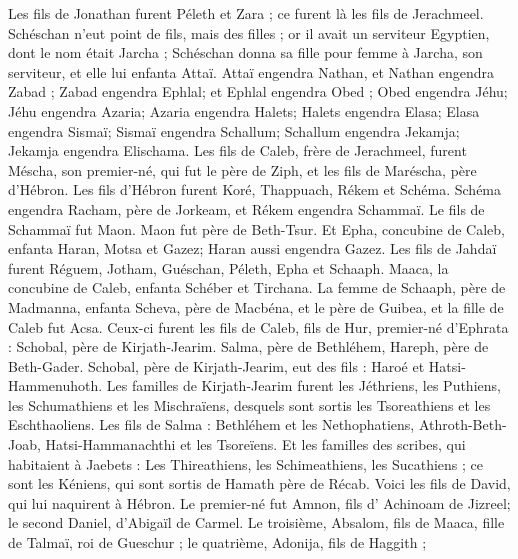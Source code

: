 \begin{multicols}{2}
Les fils de Jonathan furent Péleth et Zara ; ce furent là les fils de Jerachmeel.
Schéschan n'eut point de fils, mais des filles ; or il avait un serviteur Egyptien, dont le nom était Jarcha ;
Schéschan donna sa fille pour femme à Jarcha, son serviteur, et elle lui enfanta Attaï.
Attaï engendra Nathan, et Nathan engendra Zabad ;
Zabad engendra Ephlal; et Ephlal engendra Obed ;
 Obed engendra Jéhu; Jéhu engendra Azaria;
Azaria engendra Halets;  Halets engendra Elasa;
Elasa engendra Sismaï; Sismaï engendra Schallum;
Schallum engendra Jekamja; Jekamja engendra Elischama.
Les fils de Caleb, frère de Jerachmeel, furent Méscha, son premier-né, qui fut le père de Ziph, et les fils de Maréscha, père d'Hébron.
Les fils d'Hébron furent  Koré, Thappuach, Rékem et Schéma.
Schéma engendra Racham, père de Jorkeam, et Rékem engendra Schammaï.
Le fils de Schammaï fut Maon. Maon fut père de Beth-Tsur.
Et Epha, concubine de Caleb, enfanta Haran, Motsa et Gazez; Haran aussi engendra Gazez.
Les fils de Jahdaï furent Réguem, Jotham, Guéschan, Péleth, Epha et Schaaph.
Maaca, la concubine de Caleb, enfanta Schéber et Tirchana.
La femme de Schaaph, père de Madmanna, enfanta Scheva, père de Macbéna, et le père de Guibea, et la fille de Caleb fut Acsa.
Ceux-ci furent les fils de Caleb, fils de Hur, premier-né d'Ephrata : Schobal, père de Kirjath-Jearim.
Salma, père de Bethléhem, Hareph, père de Beth-Gader.
Schobal, père de Kirjath-Jearim, eut des fils : Haroé et Hatsi-Hammenuhoth.
Les familles de Kirjath-Jearim furent les Jéthriens, les Puthiens, les Schumathiens et les Mischraïens, desquels sont sortis les Tsoreathiens et les Eschthaoliens.
Les fils de Salma : Bethléhem et les Nethophatiens, Athroth-Beth-Joab, Hatsi-Hammanachthi et les Tsoreïens.
Et les familles des scribes, qui habitaient à Jaebets : Les Thireathiens, les Schimeathiens, les Sucathiens ; ce sont les Kéniens, qui sont sortis de Hamath père de Récab.
\VerseOne{}Voici les fils de David, qui lui naquirent à Hébron. Le premier-né fut Amnon, fils d' Achinoam de Jizreel; le second Daniel, d'Abigaïl de Carmel.
Le troisième, Absalom, fils de Maaca, fille de Talmaï, roi de Gueschur ; le quatrième, Adonija, fils de Haggith ;

\end{multicols}
